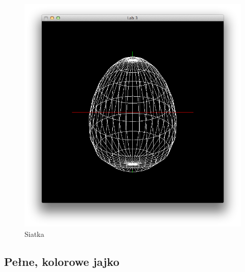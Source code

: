 \documentclass[wide,a4paper,titlepage,12pt] {article}
\begin{document}
  \begin{figure}[htbp]
    \begin{center}
      \includegraphics[scale=0.6]{mesh.png}
      \caption{Siatka}
    \end{center}
  \end{figure}

  \newpage


  \subsection{Pełne, kolorowe jajko}
  \paragraph{}

  
\end{document}
